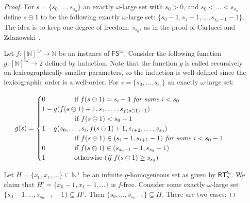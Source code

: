 \documentclass[10pt,a4paper]{article}
\newcommand{\FS}[0]{\mathsf{FS}}
\newcommand{\RT}[0]{\mathsf{RT}}
\newcommand{\NN}[0]{\mathbb{N}}
\numberwithin{theorem}{section}
\begin{document}
\begin{proof}
For $s = \{s_0, \dots, s_{s_0}\}$ an exactly $\omega$-large set with $s_0 > 0$, and $s_0 < \dots < s_{s_0}$ define $s \ominus 1$ to be the following exactly $\omega$-large set: $\{s_0 - 1,s_1 - 1, \dots, s_{s_0 - 1} - 1\}$. The idea is to keep one degree of freedom: $s_{s_0}$, as in the proof of Carlucci and Zdanowski~\cite[Proposition 4.1]{carlucci2014strength}.

Let $f : [\NN]^{!\omega} \to \NN$ be an instance of $\FS^{!\omega}$. Consider the following function $g : [\NN]^{!\omega} \to 2$ defined by induction. Note that the function $g$ is called recursively on  lexicographically smaller parameters, so the induction is well-defined since the lexicographic order is a well-order. For $s = \{s_0, \dots, s_{s_0}\}$ an exactly $\omega$-large set:


\begin{equation*}
    g(s) = \begin{cases}
           0 \hspace{1.5cm} \text{if } f(s \ominus 1) = s_i - 1 \textit{ for some } i < s_0 & \\
           1 - g(f(s \ominus 1) + 1, s_1, \dots, s_{f(s \ominus 1) + 1}) & \\ 
            \hspace{1.7cm} \text{if } f(s \ominus 1) < s_0 - 1  \\
           1 - g(s_0, \dots, s_i, f(s \ominus 1) + 1, s_{i+2}, \dots, s_{s_0}) & \\
            \hspace{1.7cm} \text{if } f(s \ominus 1) \in (s_i - 1, s_{i+1} - 1) \textit{ for some } i < s_0 - 1  \\
           0 \hspace{1.5cm} \text{if } f(s \ominus 1) \in (s_{s_0 - 1} - 1, s_{s_0} - 1) \\
           1 \hspace{1.5cm}  \text{otherwise } (\textit{if } f(s \ominus 1) \geq s_{s_0} ) \\      
           \end{cases} \quad
\end{equation*}

Let $H = \{x_0, x_1, \dots \}\subseteq \NN^+$ %
be an infinite $g$-homogeneous set as given by $\RT^{!\omega}_2$. We claim that $H' = \{x_0 - 1, x_1 - 1, \dots \}$ is $f$-free. Consider some exactly $\omega$-large set $\{s_0 - 1, \dots, s_{s_0 - 1} - 1\} \subseteq H'$. Then $\{s_0, \dots, s_{s_0 - 1}\} \subseteq H$. There are two cases:


\end{proof}
\end{document}
